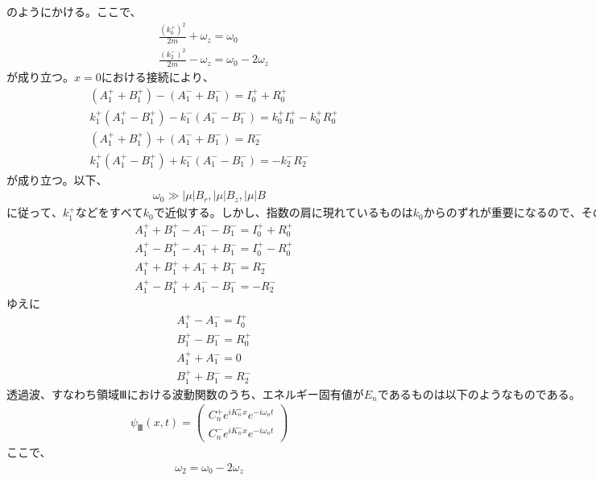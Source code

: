 のようにかける。ここで、
\begin{align}
&\frac{(k_{0}^+)^{2}}{2m}+\omega_{z}=\omega_{0} \\
&\frac{(k_{2}^-)^{2}}{2m}-\omega_{z}=\omega_{0}-2\omega_{z}
\end{align}
$が成り立つ。x=0における接続により、$
\begin{align}
&(A_{1}^{+}+B_{1}^{+})-(A_{1}^{-}+B_{1}^{-})=I_{0}^{+}+R_{0}^{+} \\
&k_{1}^{+}(A_{1}^{+}-B_{1}^{+})-k_{1}^{-}(A_{1}^{-}-B_{1}^{-})=k_{0}^{+}I_{0}^{+}-k_{0}^{+}R_{0}^{+} \\
&(A_{1}^{+}+B_{1}^{+})+(A_{1}^{-}+B_{1}^{-})=R_{2}^{-} \\
&k_{1}^{+}(A_{1}^{+}-B_{1}^{+})+k_{1}^{-}(A_{1}^{-}-B_{1}^{-})=-k_{2}^{-}R_{2}^{-}
\end{align}
が成り立つ。以下、
\begin{align}
\omega_{0} \gg |{\mu}|B_{r},  |{\mu}|B_{z},  |{\mu}|B
\end{align}
$に従って、k_{1}^{+}などをすべてk_{0}で近似する。しかし、指数の肩に現れているものはk_{0}からのずれが重要になるので、そのままにしておく。この近似が反射波を無視することに対応する。$
\begin{align}
&A_{1}^{+}+B_{1}^{+}-A_{1}^{-}-B_{1}^{-}=I_{0}^{+}+R_{0}^{+} \\
&A_{1}^{+}-B_{1}^{+}-A_{1}^{-}+B_{1}^{-}=I_{0}^{+}-R_{0}^{+} \\
&A_{1}^{+}+B_{1}^{+}+A_{1}^{-}+B_{1}^{-}=R_{2}^{-} \\
&A_{1}^{+}-B_{1}^{+}+A_{1}^{-}-B_{1}^{-}=-R_{2}^{-}
\end{align}
ゆえに
\begin{align}
&A_{1}^{+}-A_{1}^{-}=I_{0}^{+} \\
&B_{1}^{+}-B_{1}^{-}=R_{0}^{+} \\
&A_{1}^{+}+A_{1}^{-}=0 \\
&B_{1}^{+}+B_{1}^{-}=R_{2}^{-}
\end{align}
$透過波、すなわち領域Ⅲにおける波動関数のうち、エネルギー固有値がE_{n}であるものは以下のようなものである。$
\begin{align}
{\psi}_{Ⅲ}(x,t)=
\begin{pmatrix}
C_{n}^{+}e^{iK_{n}^{+}x}e^{-i\omega_{n}t} \\
C_{n}^{-}e^{iK_{n}^{-}x}e^{-i\omega_{n}t} 
\end{pmatrix}
\end{align}
ここで、
\begin{align}
\omega_{2}=\omega_{0}-2\omega_{z}
\end{align}
